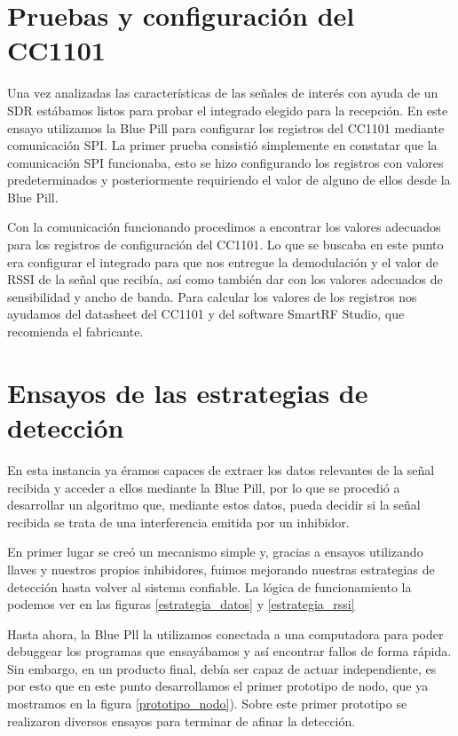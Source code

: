 \section {Pruebas y configuración del CC1101}

Una vez analizadas las características de las señales de interés con ayuda de un SDR estábamos listos para probar el integrado elegido para la
recepción. En este ensayo utilizamos la Blue Pill para configurar los registros del CC1101 mediante comunicación SPI.
La primer prueba consistió simplemente en constatar que la comunicación SPI funcionaba, esto se hizo configurando los registros con valores predeterminados 
y posteriormente requiriendo el valor de alguno de ellos desde la Blue Pill.\par 
Con la comunicación funcionando procedimos a encontrar los valores adecuados para los registros de configuración del CC1101.
Lo que se buscaba en este punto era configurar el integrado para que nos entregue la demodulación y el valor de RSSI de la señal que recibía, 
así como también dar con los valores adecuados de sensibilidad y ancho de banda. Para calcular los valores de los registros nos ayudamos del datasheet del CC1101
y del software SmartRF Studio, que recomienda el fabricante.

\section{Ensayos de las estrategias de detección}

En esta instancia ya éramos capaces de extraer los datos relevantes de la señal recibida y acceder a ellos mediante la Blue Pill, por lo que se procedió a
desarrollar un algoritmo que, mediante estos datos, pueda decidir si la señal recibida se trata de una interferencia emitida por un inhibidor.\par
En primer lugar se creó un mecanismo simple y, gracias a ensayos utilizando llaves y nuestros propios inhibidores, fuimos mejorando nuestras estrategias
de detección hasta volver al sistema confiable. La lógica de funcionamiento la podemos ver en las figuras \ref{estrategia_datos} y \ref{estrategia_rssi}\par 
Hasta ahora, la Blue Pll la utilizamos conectada a una computadora para poder debuggear los programas que ensayábamos y así encontrar fallos de forma
rápida. Sin embargo, en un producto final, debía ser capaz de actuar independiente, es por esto que en este punto desarrollamos el primer
prototipo de nodo, que ya mostramos en la figura \ref{prototipo_nodo}). Sobre este primer prototipo se realizaron diversos ensayos para terminar
de afinar la detección. \par

